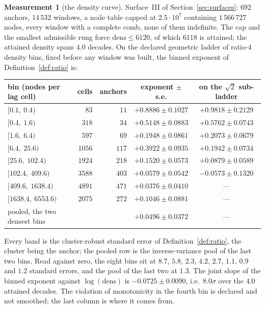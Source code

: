 \documentclass[11pt,a4paper]{article}
\theoremstyle{plain}
\theoremstyle{definition}
\newtheorem{measurement}[theorem]{Measurement}
\begin{document}
\begin{measurement}[the density curve]
\label{meas:density}
Surface~III of Section~\ref{sec:surfaces}: $692$ anchors, $14\,532$ windows, a
node table capped at $2.5\cdot10^{7}$ containing $1\,566\,727$ nodes, every
window with a complete comb, none of them indefinite. The cap and the smallest
admissible rung force $\mathrm{dens}\le6120$, of which $6118$ is attained; the
attained density spans $4.0$ decades. On the declared geometric ladder of
ratio-$4$ density bins, fixed before any window was built, the binned exponent
of Definition~\ref{def:ratio} is:

\begin{center}\small
\begin{tabular}{@{}lrrcc@{}}
\toprule
bin (nodes per lag cell) & cells & anchors & exponent $\pm$ s.e.
  & on the $\sqrt2$ sub-ladder \\
\midrule
$[0.1,\ 0.4)$        &   $83$ &  $11$ & $+0.8886\pm0.1027$
  & $+0.9818\pm0.2129$ \\
$[0.4,\ 1.6)$        &  $318$ &  $34$ & $+0.5148\pm0.0883$
  & $+0.5762\pm0.0743$ \\
$[1.6,\ 6.4)$        &  $597$ &  $69$ & $+0.1948\pm0.0861$
  & $+0.2073\pm0.0679$ \\
$[6.4,\ 25.6)$       & $1056$ & $117$ & $+0.3922\pm0.0935$
  & $+0.1942\pm0.0734$ \\
$[25.6,\ 102.4)$     & $1924$ & $218$ & $+0.1520\pm0.0573$
  & $+0.0879\pm0.0589$ \\
$[102.4,\ 409.6)$    & $3588$ & $403$ & $+0.0579\pm0.0542$
  & $-0.0573\pm0.1320$ \\
$[409.6,\ 1638.4)$   & $4891$ & $471$ & $+0.0376\pm0.0410$
  & --- \\
$[1638.4,\ 6553.6)$  & $2075$ & $272$ & $+0.1046\pm0.0881$
  & --- \\
\midrule
pooled, the two densest bins & & & $+0.0496\pm0.0372$ & --- \\
\bottomrule
\end{tabular}
\end{center}

\noindent
Every band is the cluster-robust standard error of
Definition~\ref{def:ratio}, the cluster being the anchor; the pooled row is the
inverse-variance pool of the last two bins. Read against zero, the eight bins
sit at $8.7$, $5.8$, $2.3$, $4.2$, $2.7$, $1.1$, $0.9$ and $1.2$ standard
errors, and the pool of the last two at $1.3$. The joint slope of the binned
exponent against $\log(\mathrm{dens})$ is $-0.0725\pm0.0090$, i.e.\ $8.0\sigma$
over the $4.0$ attained decades. The violation of monotonicity in the fourth
bin is declared and not smoothed; the last column is where it comes from.


\end{measurement}
\end{document}
